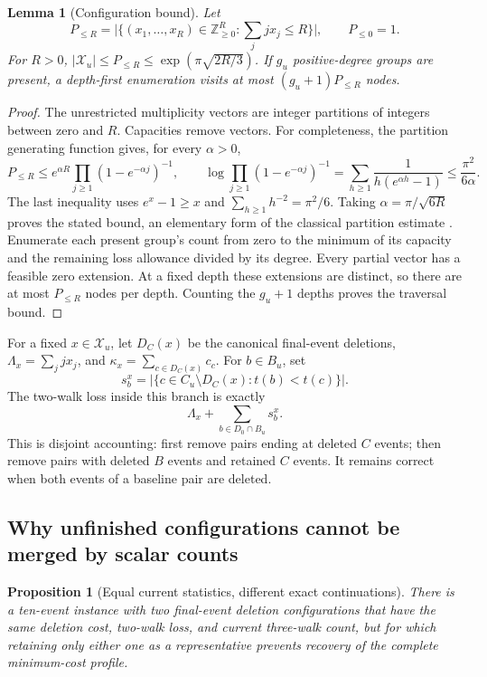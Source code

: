 \documentclass[11pt]{article}
\newtheorem{lemma}[theorem]{Lemma}
\newtheorem{proposition}[theorem]{Proposition}
\theoremstyle{remark}
\newcommand{\Ppart}{P_{\le R}}
\begin{document}
\begin{lemma}[Configuration bound]\label{lem:partitions}
Let
\[
 \Ppart=\bigl|\{(x_1,\ldots,x_R)\in\mathbb Z_{\ge0}^{R}:
                          \textstyle\sum_j jx_j\le R\}\bigr|,
 \qquad P_{\le0}=1.
\]
For $R>0$, $|\mathcal X_u|\le\Ppart\le
\exp(\pi\sqrt{2R/3})$. If $g_u$ positive-degree groups are present, a
depth-first enumeration visits at most $(g_u+1)\Ppart$ nodes.
\end{lemma}

\begin{proof}
The unrestricted multiplicity vectors are integer partitions of integers
between zero and $R$. Capacities remove vectors. For completeness, the
partition generating function gives, for every $\alpha>0$,
\[
 \Ppart\le e^{\alpha R}\prod_{j\ge1}(1-e^{-\alpha j})^{-1},\qquad
 \log\prod_{j\ge1}(1-e^{-\alpha j})^{-1}
 =\sum_{h\ge1}\frac{1}{h(e^{\alpha h}-1)}
 \le\frac{\pi^2}{6\alpha}.
\]
The last inequality uses $e^x-1\ge x$ and
$\sum_{h\ge1}h^{-2}=\pi^2/6$. Taking $\alpha=\pi/\sqrt{6R}$ proves the stated
bound, an elementary form of the classical partition estimate
\citep{hardy1918}. Enumerate each present group's count from zero to the
minimum of its capacity and the remaining loss allowance divided by its
degree. Every partial vector has a feasible zero extension. At a fixed
depth these extensions are distinct, so there are at most $\Ppart$ nodes
per depth. Counting the $g_u+1$ depths proves the traversal bound.
\end{proof}

For a fixed $x\in\mathcal X_u$, let $D_C(x)$ be the canonical final-event
deletions, $\Lambda_x=\sum_j jx_j$, and
$\kappa_x=\sum_{c\in D_C(x)}c_c$. For $b\in B_u$, set
\[
 s_b^x=|\{c\in C_u\setminus D_C(x):t(b)<t(c)\}|.
\]
The two-walk loss inside this branch is exactly
\begin{equation}
 \Lambda_x+\sum_{b\in D_0\cap B_u}s_b^x.
 \label{eq:disjointloss}
\end{equation}
This is disjoint accounting: first remove pairs ending at deleted $C$ events;
then remove pairs with deleted $B$ events and retained $C$ events. It remains
correct when both events of a baseline pair are deleted.


\subsection{Why unfinished configurations cannot be merged by scalar counts}

\begin{proposition}[Equal current statistics, different exact continuations]
\label{prop:unfinished}
There is a ten-event instance with two final-event deletion configurations
that have the same deletion cost, two-walk loss, and current three-walk count,
but for which retaining only either one as a representative prevents recovery
of the complete minimum-cost profile.
\end{proposition}
\end{document}
